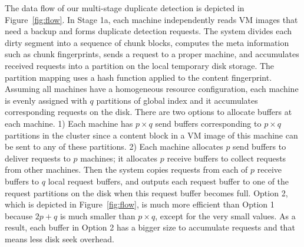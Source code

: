 The data flow of our multi-stage duplicate detection is depicted in Figure~\ref{fig:flow}. 
In Stage 1a, each machine independently reads  
VM images that need a backup
and forms duplicate  detection requests. 
The system divides  each dirty segment into a sequence of chunk blocks,  computes the meta 
information such as chunk fingerprints,  sends a request to a proper machine, and accumulates  
received requests into a partition on the local temporary disk storage. 
The partition mapping uses a hash function applied to the content fingerprint. 
Assuming all machines have a  homogeneous resource configuration, each machine is evenly  assigned with
$q$ partitions of global index and it accumulates corresponding requests on the disk. 
There are two options to allocate buffers at each machine. 
1) Each machine has  $p\times q$ send buffers corresponding to $p\times q$ partitions in the cluster
since a content block in a VM image of this machine can be sent to any of these partitions.
2) Each machine allocates $p$ send buffers to deliver requests to $p$ machines; it allocates 
$p$ receive buffers to collect requests  from other machines.
Then the system copies requests from each of $p$ receive buffers to  $q$ local request buffers,
and outputs each request buffer to one of the request partitions on the disk
when this request buffer becomes full.  Option 2, which is  depicted in Figure~\ref{fig:flow},
is much more efficient than Option 1 because $2p+q$ is much smaller than
$p\times q$, except for the very small  values. 
As a result, each buffer in Option 2 has a bigger size to accumulate requests and that means
less disk seek overhead.

